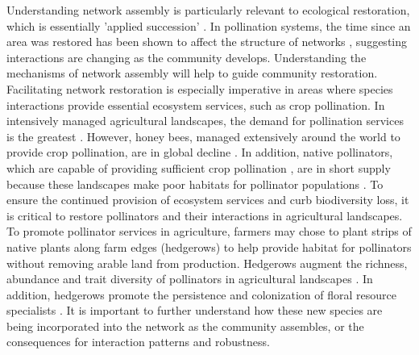 \documentclass[12pt]{article}
\begin{document}
Understanding network assembly is particularly relevant to ecological
restoration, which is essentially 'applied succession'
\citep[e.g.,][]{parker1997scale}. In pollination systems, the time
since an area was restored has been shown to affect the structure of
networks \citep{forup-2008-742, devoto2012understanding}, suggesting
interactions are changing as the community develops. Understanding the
mechanisms of network assembly will help to guide community
restoration. Facilitating network restoration is especially imperative
in areas where species interactions provide essential ecosystem
services, such as crop pollination. In intensively managed
agricultural landscapes, the demand for pollination services is the
greatest \citep{kremen-2008-10}. However, honey bees, managed
extensively around the world to provide crop pollination, are in
global decline \citep{neumann-2010-1, van-engelsdorp-2009-e6481}. In
addition, native pollinators, which are capable of providing
sufficient crop pollination \citep{kremen-2002-16816,
  winfree-2007-1105, kremen-2004-1109}, are in short supply because
these landscapes make poor habitats for pollinator populations
\citep{kremen-2002-16816}. To ensure the continued provision of
ecosystem services and curb biodiversity loss, it is critical to
restore pollinators and their interactions in agricultural
landscapes. To promote pollinator services in agriculture, farmers may
chose to plant strips of native plants along farm edges (hedgerows) to
help provide habitat for pollinators without removing arable land from
production. Hedgerows augment the richness, abundance and trait
diversity of pollinators in agricultural landscapes
\citep{morandin-2013-829, mgonigle-2015-x, kremen-2015-602,
  ponisio2015farm}. In addition, hedgerows promote the persistence and
colonization of floral resource specialists
\citep{mgonigle-2015-x}. It is important to further understand how
these new species are being incorporated into the network as the
community assembles, or the consequences for interaction patterns and
robustness.
\end{document}
